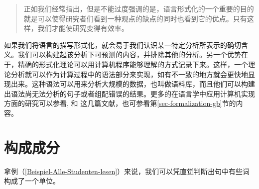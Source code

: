 \begin{quote}
正如我们经常指出，但是不能过度强调的是，语言形式化的一个重要的目的就是可以使得研究者们看到一种观点的缺点的同时也看到它的优点。只有这样，我们才能使研究变得有效率。
\citep[]{Dowty79a}
\end{quote}
%
如果我们将语言的描写形式化，就会易于我们认识某一特定分析所表示的确切含义。我们可以构建起该分析下可预测的内容，并排除其他的分析。另一个优势在于，精确的形式化理论可以用计算机程序能够理解的方式记录下来。这样，一个理论分析就可以作为计算过程中的语法部分来实现，如有不一致的地方就会更快地显现出来。这种语法可以用来分析大规模的数据，也叫做语料库，而且他们可以构建出语法尚无法分析的句子或者组配错误的结果。更多的在语言学中应用计算机实现方面的研究可以参看,  和 这几篇文献，也可参看第\ref{sec-formalization-gb}节的内容。

\section{构成成分}
\label{konstituententests}\label{sec-constituents}

拿例（\ref{Beispiel-Alle-Studenten-lesen}）来说，我们可以凭直觉判断出句中有些词构成了一个单位。

